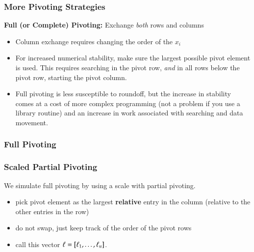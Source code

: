 \documentclass[10pt]{beamer}
\begin{document}
\begin{frame}
\frametitle{More Pivoting Strategies}

\textbf{Full (or Complete) Pivoting:} Exchange \emph{both} rows and columns
\begin{itemize}
    \item   Column exchange requires changing the order of the $x_i$
    \item   For increased numerical stability, make sure the
            largest possible pivot element is used.  This requires
            searching in the pivot row, \emph{and} in all rows
            below the pivot row, starting the pivot column.
    \item   Full pivoting is less susceptible to roundoff, but the
            increase in stability comes at a cost of more complex
            programming (not a problem if you use a library routine)
            and an increase in work associated with searching and
            data movement.
\end{itemize}

\end{frame}
\begin{frame}
\frametitle{Full Pivoting}

\vspace{3ex}
\begin{center}
\end{center}

\end{frame}
\begin{frame}
\frametitle{Scaled Partial Pivoting}
We simulate full pivoting by using a scale with partial pivoting.
\begin{itemize}
  \item pick pivot element as the largest {\bf{relative}} entry in the
column (relative to the other entries in the row)
  \item do not swap, just keep track of the order of the pivot rows
  \item call this vector ${\bf{\ell}} = [\ell_1,\dots,\ell_n]$.
\end{itemize}
\end{frame}
\end{document}
